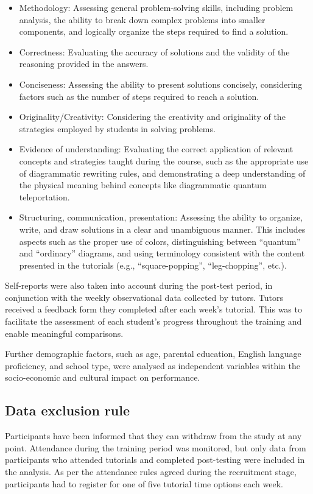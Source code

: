 \begin{itemize}
\item Methodology: Assessing general problem-solving skills, including problem analysis, the ability to break down complex problems into smaller components, and logically organize the steps required to find a solution.
\item Correctness: Evaluating the accuracy of solutions and the validity of the reasoning provided in the answers.
\item Conciseness: Assessing the ability to present solutions concisely, considering factors such as the number of steps required to reach a solution.
\item Originality/Creativity: Considering the creativity and originality of the strategies employed by students in solving problems.
\item Evidence of understanding: Evaluating the correct application of relevant concepts and strategies taught during the course, such as the appropriate use of diagrammatic rewriting rules, and demonstrating a deep understanding of the physical meaning behind concepts like diagrammatic quantum teleportation.
\item Structuring, communication, presentation: Assessing the ability to organize, write, and draw solutions in a clear and unambiguous manner. This includes aspects such as the proper use of colors, distinguishing between ``quantum'' and ``ordinary'' diagrams, and using terminology consistent with the content presented in the tutorials (e.g., ``square-popping'', ``leg-chopping'', etc.).
\end{itemize}

Self-reports were also taken into account during the post-test period, in conjunction with the weekly observational data collected by tutors. Tutors received a feedback form they completed after each week's tutorial. This was to facilitate the assessment of each student's progress throughout the training and enable meaningful comparisons.

Further demographic factors, such as age, parental education, English language proficiency, and school type, were analysed as independent variables within the socio-economic and cultural impact on performance.

\subsection{Data exclusion rule}

Participants have been informed that they can withdraw from the study at any point.
Attendance during the training period was monitored, but only data from participants who attended tutorials and completed post-testing were included in the analysis.
As per the attendance rules agreed during the recruitment stage, participants had to register for one of five tutorial time options each week.


